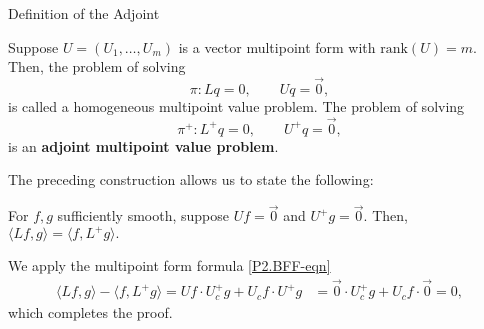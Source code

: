 \documentclass[serif, final, noamsthm]{beamer} %
\newenvironment{proof}[1][Proof.]{\begin{trivlist}
\item[\hskip \labelsep {\bfseries #1}]}{\end{trivlist}}
\begin{document}
\begin{center}
\begin{frame}
\begin{columns}[t]
{\begin{block}{Definition of the Adjoint}
\begin{defn}
Suppose $U = (U_1, \ldots, U_m)$ is a vector multipoint form with $\mathrm{rank}(U) = m.$ Then, the problem of solving 
\[ \pi: Lq = 0, \qquad Uq = \vec{0},\] 
is called a homogeneous multipoint value problem. The problem of solving 
\[ \pi^+: L^+q = 0, \qquad U^+q = \vec{0},\] 
is an \textbf{adjoint multipoint value problem}. 
\end{defn}
The preceding construction allows us to state the following:

\begin{prop}
For $f,g$ sufficiently smooth, suppose $Uf = \vec{0}$ and $U^+g = \vec{0}.$ Then, $\langle Lf, g\rangle = \langle f, L^+g\rangle.$
\end{prop}

\begin{proof}
We apply the multipoint form formula \eqref{P2.BFF-eqn}
\begin{align*}
\langle Lf, g\rangle - \langle f, L^+g\rangle = Uf\cdot U^+_c g + U_c f \cdot U^+ g &= \vec{0}\cdot U^+_c g + U_c f \cdot \vec{0} = 0,
\end{align*} 
which completes the proof.
\end{proof}
\end{block}
          
}
\end{columns}
\end{frame}
\end{center}
\end{document}
